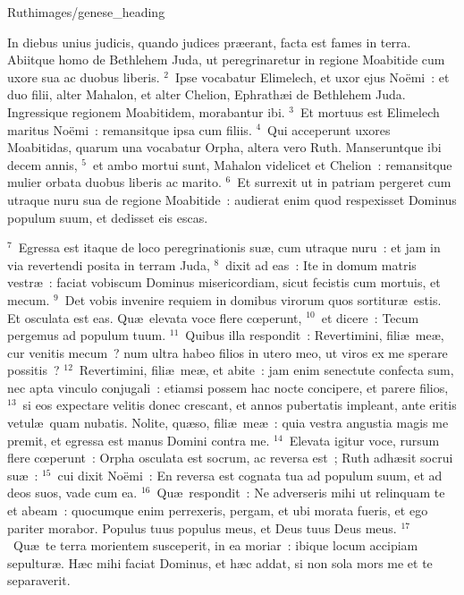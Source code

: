 {Ruth}{images/genese_heading}


\lettrine[lines=6,image=true,loversize=0.05,lraise=-0.03]{I}{}n diebus unius judicis, quando judices pr\ae erant, facta est fames in terra. Abiitque homo de Bethlehem Juda, ut peregrinaretur in regione Moabitide cum uxore sua ac duobus liberis.
${}^{2}$~Ipse vocabatur Elimelech, et uxor ejus No\"emi~: et duo filii, alter Mahalon, et alter Chelion, Ephrath\ae i de Bethlehem Juda. Ingressique regionem Moabitidem, morabantur ibi.
${}^{3}$~Et mortuus est Elimelech maritus No\"emi~: remansitque ipsa cum filiis.
${}^{4}$~Qui acceperunt uxores Moabitidas, quarum una vocabatur Orpha, altera vero Ruth. Manseruntque ibi decem annis,
${}^{5}$~et ambo mortui sunt, Mahalon videlicet et Chelion~: remansitque mulier orbata duobus liberis ac marito.
${}^{6}$~Et surrexit ut in patriam pergeret cum utraque nuru sua de regione Moabitide~: audierat enim quod respexisset Dominus populum suum, et dedisset eis escas.


${}^{7}$~Egressa est itaque de loco peregrinationis su\ae , cum utraque nuru~: et jam in via revertendi posita in terram Juda,
${}^{8}$~dixit ad eas~: Ite in domum matris vestr\ae~: faciat vobiscum Dominus misericordiam, sicut fecistis cum mortuis, et mecum.
${}^{9}$~Det vobis invenire requiem in domibus virorum quos sortitur\ae\ estis. Et osculata est eas. Qu\ae\ elevata voce flere cœperunt,
${}^{10}$~et dicere~: Tecum pergemus ad populum tuum.
${}^{11}$~Quibus illa respondit~: Revertimini, fili\ae\ me\ae , cur venitis mecum~? num ultra habeo filios in utero meo, ut viros ex me sperare possitis~?
${}^{12}$~Revertimini, fili\ae\ me\ae , et abite~: jam enim senectute confecta sum, nec apta vinculo conjugali~: etiamsi possem hac nocte concipere, et parere filios,
${}^{13}$~si eos expectare velitis donec crescant, et annos pubertatis impleant, ante eritis vetul\ae\ quam nubatis. Nolite, qu\ae so, fili\ae\ me\ae~: quia vestra angustia magis me premit, et egressa est manus Domini contra me.
${}^{14}$~Elevata igitur voce, rursum flere cœperunt~: Orpha osculata est socrum, ac reversa est~; Ruth adh\ae sit socrui su\ae~:
${}^{15}$~cui dixit No\"emi~: En reversa est cognata tua ad populum suum, et ad deos suos, vade cum ea.
${}^{16}$~Qu\ae\ respondit~: Ne adverseris mihi ut relinquam te et abeam~: quocumque enim perrexeris, pergam, et ubi morata fueris, et ego pariter morabor. Populus tuus populus meus, et Deus tuus Deus meus.
${}^{17}$~Qu\ae\ te terra morientem susceperit, in ea moriar~: ibique locum accipiam sepultur\ae . H\ae c mihi faciat Dominus, et h\ae c addat, si non sola mors me et te separaverit.



